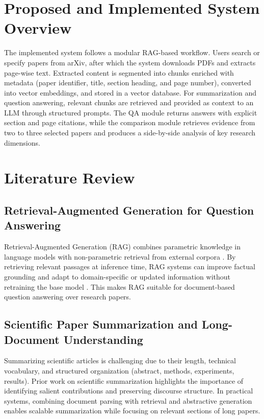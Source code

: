 \section{Proposed and Implemented System Overview}
The implemented system follows a modular RAG-based workflow. Users search or specify papers from arXiv, after which the system downloads PDFs and extracts page-wise text. Extracted content is segmented into chunks enriched with metadata (paper identifier, title, section heading, and page number), converted into vector embeddings, and stored in a vector database. For summarization and question answering, relevant chunks are retrieved and provided as context to an LLM through structured prompts. The QA module returns answers with explicit section and page citations, while the comparison module retrieves evidence from two to three selected papers and produces a side-by-side analysis of key research dimensions.

\section{Literature Review}

\subsection{Retrieval-Augmented Generation for Question Answering}
Retrieval-Augmented Generation (RAG) combines parametric knowledge in language models with non-parametric retrieval from external corpora \cite{b8}. By retrieving relevant passages at inference time, RAG systems can improve factual grounding and adapt to domain-specific or updated information without retraining the base model \cite{b9}. This makes RAG suitable for document-based question answering over research papers.

\subsection{Scientific Paper Summarization and Long-Document Understanding}
Summarizing scientific articles is challenging due to their length, technical vocabulary, and structured organization (abstract, methods, experiments, results). Prior work on scientific summarization highlights the importance of identifying salient contributions and preserving discourse structure. In practical systems, combining document parsing with retrieval and abstractive generation enables scalable summarization while focusing on relevant sections of long papers.


